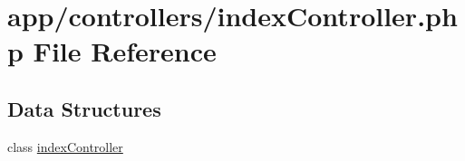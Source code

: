 \hypertarget{index_controller_8php}{}\section{app/controllers/index\+Controller.php File Reference}
\label{index_controller_8php}
\subsection*{Data Structures}
\begin{DoxyCompactItemize}
\item 
class \hyperlink{classindex_controller}{index\+Controller}
\end{DoxyCompactItemize}
